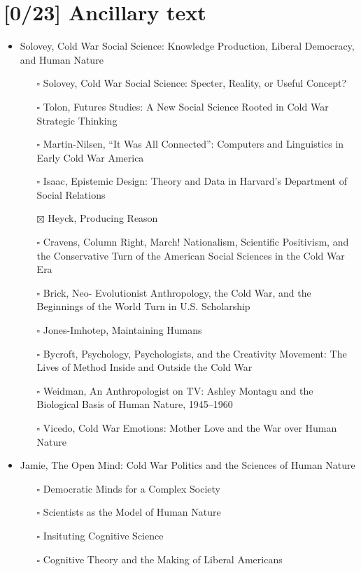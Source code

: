 \documentclass[paper=B6,portrait,twoside=true,twocolumn=false,headinclude=true,footinclude=false,fontsize=12,BCOR=10mm,DIV=calc,pagesize=auto,titlepage=firstiscover,mpinclude=false,headings=normal,headings=twolinechapter,open=right,toc=graduated,chapterprefix=false,numbers=endperiod,parskip=half+]{scrbook}
\theoremstyle{definition}
\begin{document}
\section{[0/23] Ancillary text}
\label{sec:org2a45ead}
\begin{itemize}
\item\relax [1/11] Solovey, Cold War Social Science: Knowledge Production, Liberal
Democracy, and Human Nature
\begin{itemize}
\item[{$\square$}] Solovey, Cold War Social Science: Specter, Reality, or Useful Concept?
\item[{$\square$}] Tolon, Futures Studies: A New Social Science Rooted in Cold War Strategic Thinking
\item[{$\square$}] Martin-Nilsen, “It Was All Connected”: Computers and Linguistics in Early Cold War America
\item[{$\square$}] Isaac, Epistemic Design: Theory and Data in Harvard’s Department of Social Relations
\item[{$\boxtimes$}] Heyck, Producing Reason
\item[{$\square$}] Cravens, Column Right, March! Nationalism, Scientific Positivism, and the Conservative Turn of the American Social Sciences in the Cold War Era
\item[{$\square$}] Brick, Neo- Evolutionist Anthropology, the Cold War, and the Beginnings of the World Turn in U.S. Scholarship
\item[{$\square$}] Jones-Imhotep, Maintaining Humans
\item[{$\square$}] Bycroft, Psychology, Psychologists, and the Creativity Movement: The Lives of Method Inside and Outside the Cold War
\item[{$\square$}] Weidman, An Anthropologist on TV: Ashley Montagu and the Biological
Basis of Human Nature, 1945–1960
\item[{$\square$}] Vicedo, Cold War Emotions: Mother Love and the War over Human Nature
\end{itemize}
\item\relax [0/5] Jamie, The Open Mind: Cold War Politics and the Sciences of Human
Nature
\begin{itemize}
\item[{$\square$}] Democratic Minds for a Complex Society
\item[{$\square$}] Scientists as the Model of Human Nature
\item[{$\square$}] Insituting Cognitive Science
\item[{$\square$}] Cognitive Theory and the Making of Liberal Americans

\end{itemize}
\end{itemize}
\end{document}
